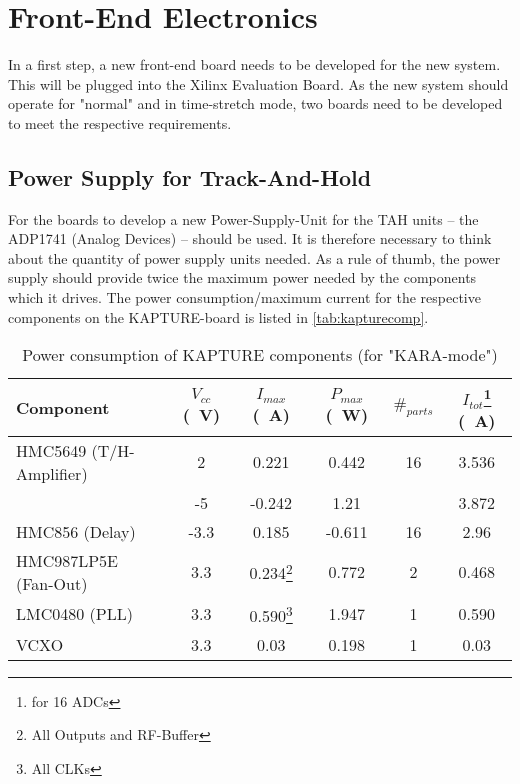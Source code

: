 \section{Front-End Electronics}
In a first step, a new front-end board needs to be developed for the new system. This will be plugged into the Xilinx Evaluation Board. As the new system should operate for "normal" and in time-stretch mode, two boards need to be developed to meet the respective requirements.

\subsection{Power Supply for Track-And-Hold}
For the boards to develop a new Power-Supply-Unit for the TAH units -- the ADP1741 (Analog Devices) -- should be used. It is therefore necessary to think about the quantity of power supply units needed. As a rule of thumb, the power supply should provide twice the maximum power needed by the components which it drives. The power consumption/maximum current for the respective components on the KAPTURE-board is listed in \autoref{tab:kapturecomp}. 
\begin{table}[tbh!]
	\caption{Power consumption of KAPTURE components (for "KARA-mode")}
	\label{tab:kapturecomp}
	\begin{minipage}{\textwidth}
		\centering
		\begin{tabularx}{\textwidth}{XSSSSS}
			\toprule
			\textbf{Component} & \textbf{$V_{cc}$ (\SI{}{\volt})} & \textbf{$I_{max}$ (\SI{}{\ampere})} & \textbf{$P_{max}$ (\SI{}{\watt})} & $\#_{parts}$ & \textbf{$I_{tot}$}\footnote{for 16 ADCs} (\SI{}{\ampere})\\
				\midrule
			HMC5649 (T/H-Amplifier) 	& 2	  	& 0.221 	 & 0.442 & 16 & 3.536\\
									& -5  	& -0.242 & 1.21 &  & 3.872\\
			HMC856 (Delay) 			& -3.3	& 0.185 & -0.611 & 16 & 2.96\\
			HMC987LP5E (Fan-Out) 	& 3.3 	& 0.234\footnote{All Outputs and RF-Buffer} & 0.772 & 2 & 0.468\\
			LMC0480 (PLL) 			& 3.3 	& 0.590\footnote{All CLKs} & 1.947 & 1 & 0.590\\
			VCXO 					& 3.3 	& 0.03 & 0.198 & 1 & 0.03\\
			\bottomrule
		\end{tabularx}
	\end{minipage}
\end{table}

